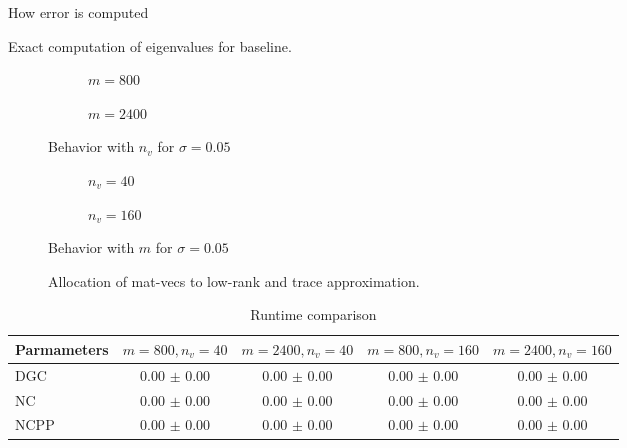 How error is computed

Exact computation of eigenvalues for baseline.

\clearpage
\begin{figure}[ht]
    \begin{subfigure}[b]{0.45\columnwidth}
        
        \caption{$m=800$}
        \label{fig:5-experiments-electronic-structure-convergence-nv-m800}
    \end{subfigure}
    \begin{subfigure}[b]{0.5\columnwidth}
        
        \caption{$m=2400$}
        \label{fig:5-experiments-electronic-structure-convergence-nv-m2400}
    \end{subfigure}
    \caption{Behavior with $n_v$ for $\sigma=0.05$}
    \label{fig:5-experiments-electronic-structure-convergence-nv}
\end{figure}

\begin{figure}[ht]
    \centering
    \begin{subfigure}[b]{0.45\columnwidth}
        
        \caption{$n_v=40$}
        \label{fig:5-experiments-electronic-structure-convergence-m-nv40}
    \end{subfigure}
    \begin{subfigure}[b]{0.5\columnwidth}
        
        \caption{$n_v=160$}
        \label{fig:5-experiments-electronic-structure-convergence-m-nv160}
    \end{subfigure}
    \caption{Behavior with $m$ for $\sigma=0.05$}
    \label{fig:5-experiments-electronic-structure-convergence-m}
\end{figure}

\begin{figure}[ht]
    \centering
    
    \caption{Allocation of mat-vecs to low-rank and trace approximation.}
    \label{fig:5-experiments-electronic-structure-matvec-mixture}
\end{figure}

\begin{table}[h]
    \caption{Runtime comparison}
    \label{tab:5-experiments-electronic-structure-runtime}
    \centering
    \renewcommand{\arraystretch}{1.2}
    \begin{tabular}{@{}lcccc@{}}
        \toprule
        Parmameters & $m=800,n_v=40$ & $m=2400,n_v=40$ & $m=800,n_v=160$ & $m=2400,n_v=160$ \\
        \midrule
        \gls{DGC} & 0.00 $\pm$ 0.00 & 0.00 $\pm$ 0.00 & 0.00 $\pm$ 0.00 & 0.00 $\pm$ 0.00 \\
        \gls{NC} & 0.00 $\pm$ 0.00 & 0.00 $\pm$ 0.00 & 0.00 $\pm$ 0.00 & 0.00 $\pm$ 0.00 \\
        \gls{NCPP} & 0.00 $\pm$ 0.00 & 0.00 $\pm$ 0.00 & 0.00 $\pm$ 0.00 & 0.00 $\pm$ 0.00 \\
        \bottomrule
    \end{tabular}
\end{table}

